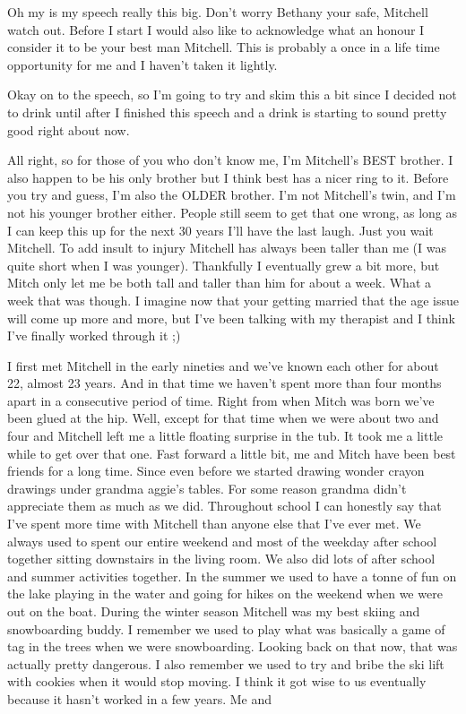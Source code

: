 \documentclass{letter}
\begin{document}
Oh my is my speech really this big. Don't worry Bethany your safe, Mitchell watch out. Before I start I would also like to acknowledge what an honour I consider it to be your best man Mitchell. This is probably a once in a life time opportunity for me and I haven't taken it lightly.

Okay on to the speech, so I'm going to try and skim this a bit since I decided not to drink until after I finished this speech and a drink is starting to sound pretty good right about now.

All right, so for those of you who don't know me, I’m Mitchell’s BEST brother. I also happen to be his only brother but I think best has a nicer ring to it.  Before you try and guess, I’m also the OLDER brother.  I’m not Mitchell’s twin, and I’m not his younger brother either.  People still seem to get that one wrong, as long as I can keep this up for the next 30 years I'll have the last laugh. Just you wait Mitchell. To add insult to injury Mitchell has always been taller than me (I was quite short when I was younger). Thankfully I eventually grew a bit more, but Mitch only let me be both tall and taller than him for about a week. What a week that was though. I imagine now that your getting married that the age issue will come up more and more, but I've been talking with my therapist and I think I've finally worked through it ;)

I first met Mitchell in the early nineties and we've known each other for about 22, almost 23 years. And in that time we haven't spent more than four months apart in a consecutive period of time. Right from when Mitch was born we've been glued at the hip. Well, except for that time when we were about two and four and Mitchell left me a little floating surprise in the tub. It took me a little while to get over that one. Fast forward a little bit, me and Mitch have been best friends for a long time. Since even before we started drawing wonder crayon drawings under grandma aggie's tables. For some reason grandma didn't appreciate them as much as we did. Throughout school I can honestly say that I've spent more time with Mitchell than anyone else that I've ever met. We always used to spent our entire weekend and most of the weekday after school together sitting downstairs in the living room. We also did lots of after school and summer activities together. In the summer we used to have a tonne of fun on the lake playing in the water and going for hikes on the weekend when we were out on the boat. During the winter season Mitchell was my best skiing and snowboarding buddy. I remember we used to play what was basically a game of tag in the trees when we were snowboarding. Looking back on that now, that was actually pretty dangerous. I also remember we used to try and bribe the ski lift with cookies when it would stop moving. I think it got wise to us eventually because it hasn't worked in a few years. Me and 
\end{document}
